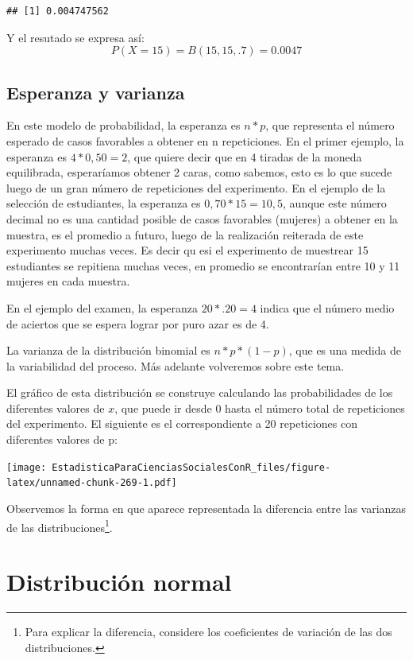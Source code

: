 \documentclass[]{book}
\let\rmarkdownfootnote\footnote%
\def\footnote{\protect\rmarkdownfootnote}
\begin{document}
\begin{verbatim}
## [1] 0.004747562
\end{verbatim}

Y el resutado se expresa así: \[P(X=15)=B(15,15,.7)=0.0047\]

\hypertarget{esperanza-y-varianza}{%
\subsection{Esperanza y varianza}\label{esperanza-y-varianza}}

En este modelo de probabilidad, la esperanza es \(n*p\), que representa
el número esperado de casos favorables a obtener en n repeticiones. En
el primer ejemplo, la esperanza es \(4*0,50=2\), que quiere decir que en 4
tiradas de la moneda equilibrada, esperaríamos obtener 2 caras, como
sabemos, esto es lo que sucede luego de un gran número de repeticiones
del experimento. En el ejemplo de la selección de estudiantes, la esperanza es \(0,70*15=10,5\), aunque este número decimal no es una cantidad posible de casos favorables (mujeres) a obtener en la muestra, es el promedio a futuro, luego de la realización reiterada de este experimento muchas veces. Es decir qu esi el experimento de muestrear 15 estudiantes se repitiena muchas veces, en promedio se encontrarían entre 10 y 11 mujeres en cada muestra.

En el ejemplo del examen, la esperanza \(20*.20=4\) indica que el número medio de aciertos que se espera lograr por puro azar es de 4.

La varianza de la distribución binomial es \(n*p*(1-p)\), que es una
medida de la variabilidad del proceso. Más adelante volveremos sobre
este tema.

El gráfico de esta distribución se construye calculando las
probabilidades de los diferentes valores de \(x\), que puede ir desde 0
hasta el número total de repeticiones del experimento. El siguiente es
el correspondiente a 20 repeticiones con diferentes valores de p:

\texttt{[image: EstadisticaParaCienciasSocialesConR\_files/figure-latex/unnamed-chunk-269-1.pdf]}

Observemos la forma en que aparece representada la diferencia entre las
varianzas de las distribuciones\footnote{Para explicar la diferencia, considere los coeficientes de
  variación de las dos distribuciones.}.

\hypertarget{distribuciuxf3n-normal}{%
\section{Distribución normal}\label{distribuciuxf3n-normal}}
\end{document}
